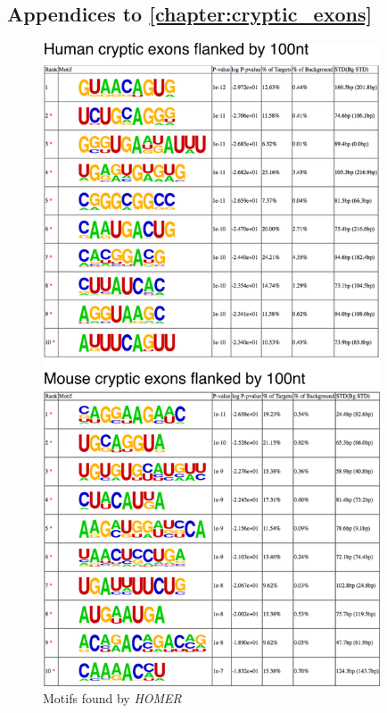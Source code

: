 
\begin{appendices}
\clearpage	


\section*{Appendices to \autoref{chapter:cryptic_exons} }

\begin{figure}
	\begin{center}
		\includegraphics[width=10cm]{Figures/03_cryptic_exons/Figure_S4_HOMER.png}
	\end{center}
	\caption{Motifs found by \textit{HOMER}}
\end{figure}

	\addtolength{\abovecaptionskip}{-25mm}



\end{appendices}
